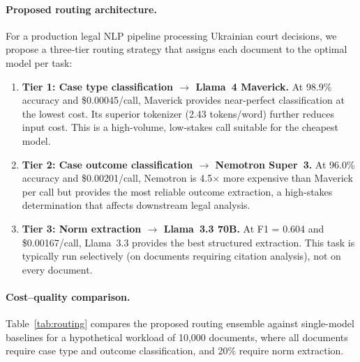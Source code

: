 \documentclass[11pt,a4paper]{article}
\begin{document}
\paragraph{Proposed routing architecture.}
For a production legal NLP pipeline processing Ukrainian court decisions, we propose a three-tier routing strategy that assigns each document to the optimal model per task:

\begin{enumerate}[leftmargin=*]
    \item \textbf{Tier 1: Case type classification $\rightarrow$ Llama~4 Maverick.} At 98.9\% accuracy and \$0.00045/call, Maverick provides near-perfect classification at the lowest cost. Its superior tokenizer (2.43 tokens/word) further reduces input cost. This is a high-volume, low-stakes call suitable for the cheapest model.
    \item \textbf{Tier 2: Case outcome classification $\rightarrow$ Nemotron Super~3.} At 96.0\% accuracy and \$0.00201/call, Nemotron is 4.5$\times$ more expensive than Maverick per call but provides the most reliable outcome extraction, a high-stakes determination that affects downstream legal analysis.
    \item \textbf{Tier 3: Norm extraction $\rightarrow$ Llama~3.3 70B.} At F1 = 0.604 and \$0.00167/call, Llama~3.3 provides the best structured extraction. This task is typically run selectively (on documents requiring citation analysis), not on every document.
\end{enumerate}

\paragraph{Cost--quality comparison.}
Table~\ref{tab:routing} compares the proposed routing ensemble against single-model baselines for a hypothetical workload of 10,000 documents, where all documents require case type and outcome classification, and 20\% require norm extraction.
\end{document}
